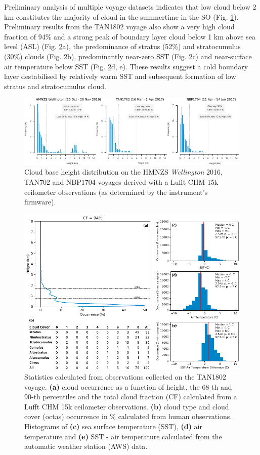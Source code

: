 Preliminary analysis of multiple voyage datasets indicates that low cloud
below 2 km constitutes the majority of cloud in the summertime in the SO
(Fig. \ref{fig:cbh}). Preliminary results from the TAN1802 voyage also
show a very high cloud fraction of 94\% and a strong peak of boundary layer
cloud below 1 km above sea level (ASL) (Fig. \ref{fig:tan1802-stats}a), the predominance
of stratus (52\%) and stratocumulus (30\%) clouds (Fig. \ref{fig:tan1802-stats}b), predominantly
near-zero SST (Fig. \ref{fig:tan1802-stats}c) and near-surface air temperature below SST
(Fig. \ref{fig:tan1802-stats}d, e). These results suggest a cold boundary layer
destabilised by relatively warm SST and subsequent formation of
low stratus and stratocumulus cloud.

\begin{figure}[t]
\includegraphics[width=\textwidth]{fig/cbh.pdf}
\caption{
Cloud base height distribution on the HMNZS \textit{Wellington} 2016, TAN702 and NBP1704
voyages derived with a Lufft CHM 15k ceilometer observations (as determined by
the instrument's firmware).
}
\label{fig:cbh}
\end{figure}

\begin{figure}[t]
\includegraphics[width=\textwidth]{fig/tan1802_stats.pdf}
\caption{
Statistics calculated from observations collected on the TAN1802 voyage.
\textbf{(a)} cloud occurrence as a function of height, the 68-th and
90-th percentiles and the total cloud fraction (CF) calculated from a Lufft CHM 15k ceilometer observations.
\textbf{(b)} cloud type and cloud cover (octas) occurrence
in \% calculated from human observations. Histograms of \textbf{(c)} sea surface temperature (SST), \textbf{(d)} air temperature
and \textbf{(e)} SST - air temperature calculated from the automatic
weather station (AWS) data.
}
\label{fig:tan1802-stats}
\end{figure}

